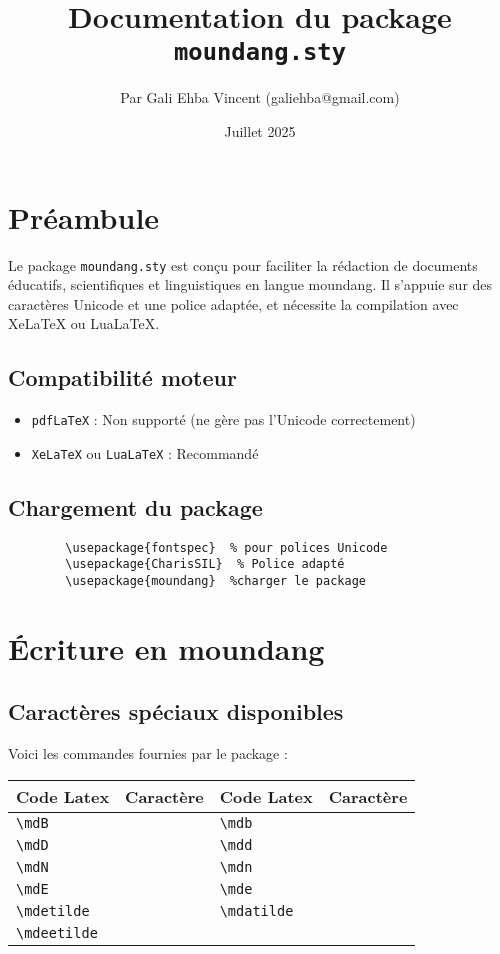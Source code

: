 \documentclass[a4paper,12pt]{article}
\title{\textbf{Documentation du package \texttt{moundang.sty}}}
\author{Par Gali Ehba Vincent (galiehba@gmail.com)}
\date{Juillet 2025}
\begin{document}
	
	\maketitle
	\newpage
	\tableofcontents
	\newpage
	\section{Préambule}
	Le package \texttt{moundang.sty} est conçu pour faciliter la rédaction de documents éducatifs, scientifiques et linguistiques en langue moundang. Il s'appuie sur des caractères Unicode et une police adaptée, et nécessite la compilation avec XeLaTeX ou LuaLaTeX.
	
	\subsection*{Compatibilité moteur}
	\begin{itemize}
		\item \texttt{pdfLaTeX} : Non supporté (ne gère pas l'Unicode correctement)
		\item \texttt{XeLaTeX} ou \texttt{LuaLaTeX} : Recommandé
	\end{itemize}
	
	\subsection*{Chargement du package}
	\begin{verbatim}
		\usepackage{fontspec}  % pour polices Unicode
		\usepackage{CharisSIL}  % Police adapté
		\usepackage{moundang}  %charger le package
	\end{verbatim}
	
	\section{Écriture en moundang}
	\subsection{Caractères spéciaux disponibles}
	Voici les commandes fournies par le package :
	
	\begin{tabular}{|l|l|l|l|}
		\hline
		Code Latex & Caractère & Code Latex & Caractère\\
		\hline
		\verb*|\mdB| & \mdB & \verb*|\mdb| & \mdb\\
		\hline
		\verb*|\mdD| & \mdD & \verb*|\mdd| & \mdd\\
		\hline
		\verb*|\mdN| & \mdN & \verb*|\mdn| & \mdn\\
		\hline
		\verb*|\mdE| & \mdE & \verb*|\mde| & \mde\\
		\hline
		\verb*|\mdetilde| & \mdetilde & \verb*|\mdatilde| & \mdatilde\\
		\hline
		\verb*|\mdeetilde| & \mdeetilde & &\\
		\hline
	\end{tabular}
	
\end{document}
